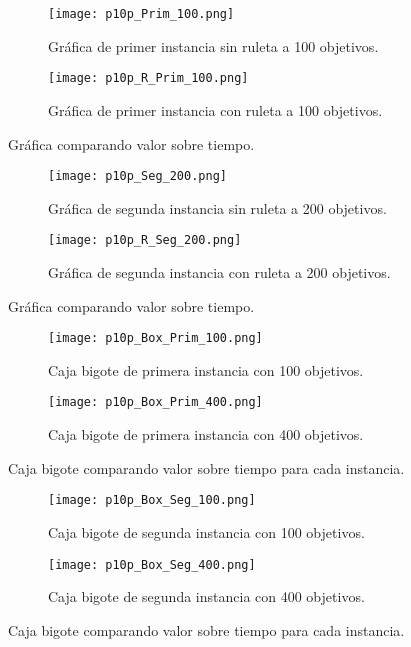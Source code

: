 \documentclass{article}
\begin{document}
\begin{figure}[H]
\centering
\begin{subfigure}[b]{0.40\linewidth}
\texttt{[image: p10p\_Prim\_100.png]}
\caption{Gráfica de primer instancia sin ruleta a 100 objetivos.}
\end{subfigure}
\begin{subfigure}[b]{0.40\linewidth}
\texttt{[image: p10p\_R\_Prim\_100.png]}
\caption{Gráfica de primer instancia con ruleta a 100 objetivos.}
\end{subfigure}
\caption{Gráfica comparando valor sobre tiempo.}
\label{fig:westminster}
\end{figure}

\begin{figure}[H]
\centering
\begin{subfigure}[b]{0.40\linewidth}
\texttt{[image: p10p\_Seg\_200.png]}
\caption{Gráfica de segunda instancia sin ruleta a 200 objetivos.}
\end{subfigure}
\begin{subfigure}[b]{0.40\linewidth}
\texttt{[image: p10p\_R\_Seg\_200.png]}
\caption{Gráfica de segunda instancia con ruleta a 200 objetivos.}
\end{subfigure}
\caption{Gráfica comparando valor sobre tiempo.}
\label{fig:westminster}
\end{figure}

\begin{figure}[H]
\centering
\begin{subfigure}[b]{0.40\linewidth}
\texttt{[image: p10p\_Box\_Prim\_100.png]}
\caption{Caja bigote de primera instancia con 100 objetivos.}
\end{subfigure}
\begin{subfigure}[b]{0.40\linewidth}
\texttt{[image: p10p\_Box\_Prim\_400.png]}
\caption{Caja bigote de primera instancia con 400 objetivos.}
\end{subfigure}
\caption{Caja bigote comparando valor sobre tiempo para cada instancia.}
\label{fig:westminster}
\end{figure}

\begin{figure}[H]
\centering
\begin{subfigure}[b]{0.40\linewidth}
\texttt{[image: p10p\_Box\_Seg\_100.png]}
\caption{Caja bigote de segunda instancia con 100 objetivos.}
\end{subfigure}
\begin{subfigure}[b]{0.40\linewidth}
\texttt{[image: p10p\_Box\_Seg\_400.png]}
\caption{Caja bigote de segunda instancia con 400 objetivos.}
\end{subfigure}
\caption{Caja bigote comparando valor sobre tiempo para cada instancia.}
\label{fig:westminster}
\end{figure}
\end{document}
